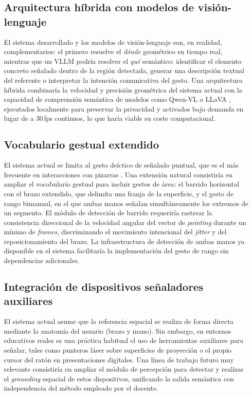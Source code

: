 \documentclass[12pt]{report} %
\begin{document}
\subsection{Arquitectura híbrida con modelos de visión-lenguaje}

El sistema desarrollado y los modelos de visión-lenguaje son, en realidad, complementarios: el primero resuelve el \textit{dónde} geométrico en tiempo real, mientras que un VLLM podría resolver el \textit{qué} semántico: identificar el elemento concreto señalado dentro de la región detectada, generar una descripción textual del referente o interpretar la intención comunicativa del gesto. Una arquitectura híbrida combinaría la velocidad y precisión geométrica del sistema actual con la capacidad de comprensión semántica de modelos como Qwen-VL \citep{bai2023qwenvl} o LLaVA \citep{liu2023llava}, ejecutados localmente para preservar la privacidad y activados bajo demanda en lugar de a 30\,fps continuos, lo que haría viable su coste computacional.

\subsection{Vocabulario gestual extendido}

El sistema actual se limita al gesto deíctico de señalado puntual, que es el más frecuente en interacciones con pizarras \citep{mcneill1992}. Una extensión natural consistiría en ampliar el vocabulario gestual para incluir gestos de área: el barrido horizontal con el brazo extendido, que delimita una franja de la superficie, y el gesto de rango bimanual, en el que ambas manos señalan simultáneamente los extremos de un segmento. El módulo de detección de barrido requeriría rastrear la consistencia direccional de la velocidad angular del vector de \textit{pointing} durante un mínimo de \textit{frames}, discriminando el movimiento intencional del \textit{jitter} y del reposicionamiento del brazo. La infraestructura de detección de ambas manos ya disponible en el sistema facilitaría la implementación del gesto de rango sin dependencias adicionales.

\subsection{Integración de dispositivos señaladores auxiliares}

El sistema actual asume que la referencia espacial se realiza de forma directa mediante la anatomía del usuario (brazo y mano). Sin embargo, en entornos educativos reales es una práctica habitual el uso de herramientas auxiliares para señalar, tales como punteros láser sobre superficies de proyección o el propio cursor del ratón en presentaciones digitales. Una línea de trabajo futuro muy relevante consistiría en ampliar el módulo de percepción para detectar y realizar el \textit{grounding} espacial de estos dispositivos, unificando la salida semántica con independencia del método empleado por el docente.
\end{document}
